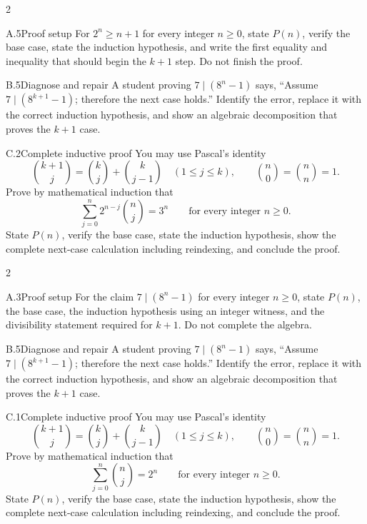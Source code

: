 \documentclass[9pt]{extarticle}
\begin{document}
\CoreWorkArea
\FormBreak
{}
\begin{multicols}{2}
\begin{CompactCoreProblem}{A.5}{Proof setup}
For $2^n\ge n+1$ for every integer $n\ge0$, state $P(n)$, verify the base case, state the induction hypothesis, and write the first equality and inequality that should begin the $k+1$ step. Do not finish the proof.
\end{CompactCoreProblem}
\begin{CompactCoreProblem}{B.5}{Diagnose and repair}
A student proving $7\mid(8^n-1)$ says, “Assume $7\mid(8^{k+1}-1)$; therefore the next case holds.” Identify the error, replace it with the correct induction hypothesis, and show an algebraic decomposition that proves the $k+1$ case.
\end{CompactCoreProblem}
\end{multicols}
\begin{CompactCoreProblem}{C.2}{Complete inductive proof}
You may use Pascal's identity
\[
\binom{k+1}{j}=\binom{k}{j}+\binom{k}{j-1}
\quad(1\le j\le k),\qquad
\binom{n}{0}=\binom{n}{n}=1.
\]
Prove by mathematical induction that
\[
\sum_{j=0}^{n} 2^{n-j}\binom{n}{j}=3^n\qquad\text{for every integer }n\ge0.
\]
State $P(n)$, verify the base case, state the induction hypothesis, show the complete next-case calculation including reindexing, and conclude the proof.
\end{CompactCoreProblem}
\CoreWorkArea
\FormBreak
{}
\begin{multicols}{2}
\begin{CompactCoreProblem}{A.3}{Proof setup}
For the claim $7\mid(8^n-1)$ for every integer $n\ge0$, state $P(n)$, the base case, the induction hypothesis using an integer witness, and the divisibility statement required for $k+1$. Do not complete the algebra.
\end{CompactCoreProblem}
\begin{CompactCoreProblem}{B.5}{Diagnose and repair}
A student proving $7\mid(8^n-1)$ says, “Assume $7\mid(8^{k+1}-1)$; therefore the next case holds.” Identify the error, replace it with the correct induction hypothesis, and show an algebraic decomposition that proves the $k+1$ case.
\end{CompactCoreProblem}
\end{multicols}
\begin{CompactCoreProblem}{C.1}{Complete inductive proof}
You may use Pascal's identity
\[
\binom{k+1}{j}=\binom{k}{j}+\binom{k}{j-1}
\quad(1\le j\le k),\qquad
\binom{n}{0}=\binom{n}{n}=1.
\]
Prove by mathematical induction that
\[
\sum_{j=0}^{n}\binom{n}{j}=2^n\qquad\text{for every integer }n\ge0.
\]
State $P(n)$, verify the base case, state the induction hypothesis, show the complete next-case calculation including reindexing, and conclude the proof.
\end{CompactCoreProblem}
\end{document}
